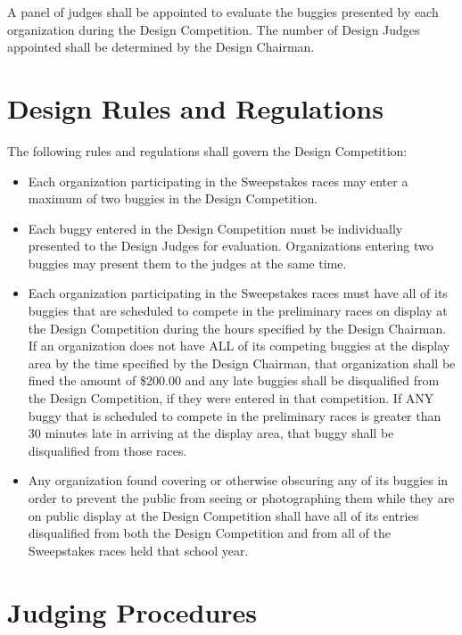 	A panel of judges shall be appointed to evaluate the buggies presented by each organization during the Design Competition. The number of Design Judges appointed shall be determined by the Design Chairman.

\section{Design Rules and Regulations}
	
	The following rules and regulations shall govern the Design Competition:

	\begin{itemize}

		\item
		Each organization participating in the Sweepstakes races may enter a maximum of two buggies in the Design Competition.

		\item
		Each buggy entered in the Design Competition must be individually presented to the Design Judges for evaluation. Organizations entering two buggies may present them to the judges at the same time.

		\item
		Each organization participating in the Sweepstakes races must have all of its buggies that are scheduled to compete in the preliminary races on display at the Design Competition during the hours specified by the Design Chairman. If an organization does not have ALL of its competing buggies at the display area by the time specified by the Design Chairman, that organization shall be fined the amount of \$200.00 and any late buggies shall be disqualified from the Design Competition, if they were entered in that competition. If ANY buggy that is scheduled to compete in the preliminary races is greater than 30 minutes late in arriving at the display area, that buggy shall be disqualified from those races.

		\item
		Any organization found covering or otherwise obscuring any of its buggies in order to prevent the public from seeing or photographing them while they are on public display at the Design Competition shall have all of its entries disqualified from both the Design Competition and from all of the Sweepstakes races held that school year.

	\end{itemize}

\section{Judging Procedures}

